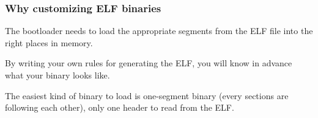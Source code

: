 
\begin{frame}
  \frametitle{Why customizing ELF binaries}

  The bootloader needs to load the appropriate segments from the ELF
  file into the right places in memory.

  \-

  By writing your own rules for generating the ELF, you will know in
  advance what your binary looks like.

  \-

  The easiest kind of binary to load is one-segment binary (every
  sections are following each other), only one header to read from the
  ELF.

\end{frame}

%
%
%

%
%

\begin{thebibliography}{4}


\end{thebibliography}
